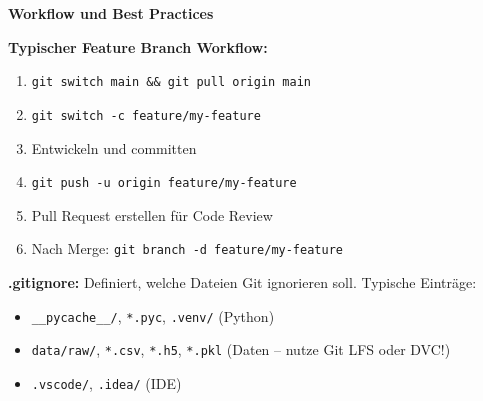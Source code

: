 \textbf{Workflow und Best Practices}

\textbf{Typischer Feature Branch Workflow:}
\begin{enumerate}
  \item \texttt{git switch main \&\& git pull origin main}
  \item \texttt{git switch -c feature/my-feature}
  \item Entwickeln und committen
  \item \texttt{git push -u origin feature/my-feature}
  \item Pull Request erstellen für Code Review
  \item Nach Merge: \texttt{git branch -d feature/my-feature}
\end{enumerate}

\textbf{.gitignore:} Definiert, welche Dateien Git ignorieren soll. Typische Einträge:
\begin{itemize}
  \item \texttt{\_\_pycache\_\_/}, \texttt{*.pyc}, \texttt{.venv/} (Python)
  \item \texttt{data/raw/}, \texttt{*.csv}, \texttt{*.h5}, \texttt{*.pkl} (Daten -- nutze Git LFS oder DVC!)
  \item \texttt{.vscode/}, \texttt{.idea/} (IDE)
\end{itemize}

\newpage